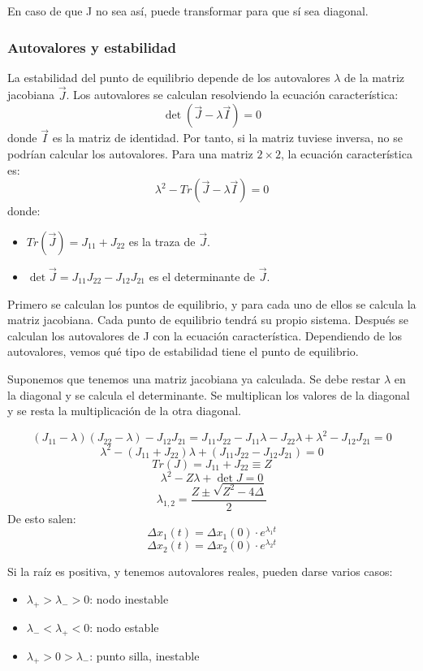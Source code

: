 En caso de que J no sea así, puede transformar para que sí sea diagonal.

\subsubsection{Autovalores y estabilidad}
La estabilidad del punto de equilibrio depende de los autovalores $\lambda$ de la matriz jacobiana $\vec{J}$. Los autovalores se calculan resolviendo la ecuación característica:
$$\det (\vec{J} - \lambda \vec{I}) = 0$$
donde $\vec{I}$ es la matriz de identidad. Por tanto, si la matriz tuviese inversa, no se podrían calcular los autovalores.
Para una matriz $2 \times 2$, la ecuación característica es:
$$\lambda^2 - Tr(\vec{J} - \lambda \vec{I}) = 0$$
donde:
\begin{itemize}
\item $Tr(\vec{J}) = J_{11} + J_{22}$ es la traza de $\vec{J}$.
\item $\det \vec{J} = J_{11}J_{22} - J_{12}J_{21}$ es el determinante de $\vec{J}$. 
\end{itemize}

Primero se calculan los puntos de equilibrio, y para cada uno de ellos se calcula la matriz jacobiana. Cada punto de equilibrio tendrá su propio sistema. Después se calculan los autovalores de J con la ecuación característica. Dependiendo de los autovalores, vemos qué tipo de estabilidad tiene el punto de equilibrio. 

Suponemos que tenemos una matriz jacobiana ya calculada. Se debe restar $\lambda$ en la diagonal y se calcula el determinante. Se multiplican los valores de la diagonal y se resta la multiplicación de la otra diagonal. 

$$(J_{11} - \lambda) (J_{22} - \lambda) - J_{12} J_{21} = J_{11} J_{22} - J_{11} \lambda - J_{22} \lambda + \lambda^2 - J_{12} J_{21} = 0$$
$$\lambda^2 - (J_{11} + J_{22}) \lambda + (J_{11} J_{22} - J_{12} J_{21}) = 0$$
$$Tr(J) = J_{11} + J_{22} \equiv Z$$
$$\lambda^2 - Z \lambda + \det J = 0$$ %
$$\lambda_{1,2} = \frac{Z \pm \sqrt{Z^2 - 4\Delta}}{2}$$
De esto salen:
$$\Delta x_1(t) = \Delta x_1(0) \cdot e^{\lambda_1 t}$$
$$\Delta x_2(t) = \Delta x_2(0) \cdot e^{\lambda_2 t}$$

Si la raíz es positiva, y tenemos autovalores reales, pueden darse varios casos:
\begin{itemize}
\item $\lambda_+ > \lambda_- > 0$: nodo inestable
\item $\lambda_- < \lambda_+ < 0$: nodo estable
\item $\lambda_+ > 0 > \lambda_-$: punto silla, inestable
\end{itemize}

